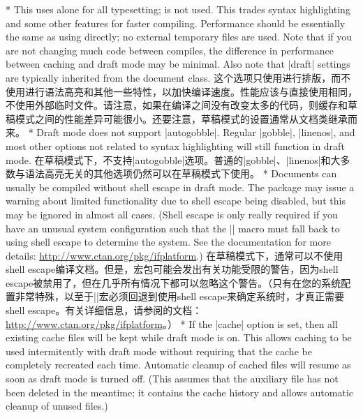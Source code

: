 \begin{paracol}{2}
\switchcolumn[0]*%
This uses  alone for all typesetting;  is not used.  This trades syntax highlighting and some other  features for faster compiling.  Performance should be essentially the same as using  directly; no external temporary files are used.  Note that if you are not changing much code between compiles, the difference in performance between caching and draft mode may be minimal.  Also note that |draft| settings are typically inherited from the document class.
\switchcolumn
{}
这个选项只使用进行排版，而不使用进行语法高亮和其他一些特性，以加快编译速度。性能应该与直接使用相同，不使用外部临时文件。请注意，如果在编译之间没有改变太多的代码，则缓存和草稿模式之间的性能差异可能很小。还要注意，草稿模式的设置通常从文档类继承而来。
\switchcolumn[0]*%
Draft mode does not support |autogobble|.  Regular |gobble|, |linenos|, and most other options not related to syntax highlighting will still function in draft mode.
\switchcolumn
在草稿模式下，不支持|autogobble|选项。普通的|gobble|、|linenos|和大多数与语法高亮无关的其他选项仍然可以在草稿模式下使用。
\switchcolumn[0]*%
Documents can usually be compiled without shell escape in draft mode.  The  package may issue a warning about limited functionality due to shell escape being disabled, but this may be ignored in almost all cases.  (Shell escape is only really required if you have an unusual system configuration such that the |\ifwindows| macro must fall back to using shell escape to determine the system.  See the  documentation for more details:  \url{http://www.ctan.org/pkg/ifplatform}.)
\switchcolumn
在草稿模式下，通常可以不使用shell escape编译文档。但是，宏包可能会发出有关功能受限的警告，因为shell escape被禁用了，但在几乎所有情况下都可以忽略这个警告。（只有在您的系统配置非常特殊，以至于|\ifwindows|宏必须回退到使用shell escape来确定系统时，才真正需要shell escape。有关详细信息，请参阅的文档：\url{http://www.ctan.org/pkg/ifplatform}。）
\switchcolumn[0]*%
If the |cache| option is set, then all existing cache files will be kept while draft mode is on.  This allows caching to be used intermitently with draft mode without requiring that the cache be completely recreated each time.  Automatic cleanup of cached files will resume as soon as draft mode is turned off.  (This assumes that the auxiliary file has not been deleted in the meantime; it contains the cache history and allows automatic cleanup of unused files.)

\end{paracol}
